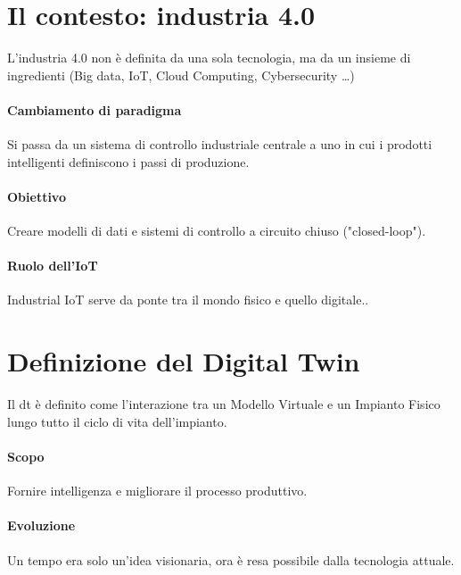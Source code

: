 %
%
\section{Il contesto: industria 4.0}
L'industria 4.0 non è definita da una sola tecnologia, ma da un insieme di ingredienti (Big data, IoT, Cloud Computing, Cybersecurity \dots)
%
\paragraph{Cambiamento di paradigma} Si passa da un sistema di controllo industriale centrale a uno in cui i prodotti intelligenti definiscono i passi di produzione.
%
\paragraph{Obiettivo} Creare modelli di dati e sistemi di controllo a circuito chiuso ("closed-loop").
%
\paragraph{Ruolo dell'IoT} Industrial IoT serve da ponte tra il mondo fisico e quello digitale..
%
\section{Definizione del Digital Twin}
Il \gls{dt} è definito come l'interazione tra un Modello Virtuale e un Impianto Fisico lungo tutto il ciclo di vita dell'impianto.
%
\paragraph{Scopo} Fornire intelligenza e migliorare il processo produttivo.
%
\paragraph{Evoluzione} Un tempo era solo un'idea visionaria, ora è resa possibile dalla tecnologia attuale.

%
